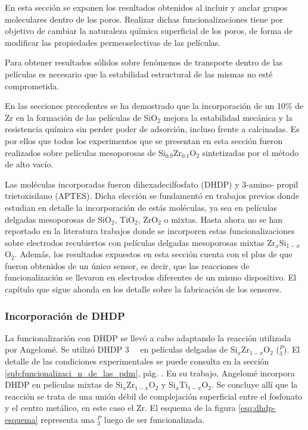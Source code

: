 			En esta sección se exponen los resultados obtenidos al incluir y anclar grupos moleculares dentro de los poros. Realizar dichas funcionalizaciones tiene por objetivo de cambiar la naturaleza química superficial de los poros, de forma de modificar las propiedades permeoselectivas de las películas. 

			Para obtener resultados sólidos sobre fenómenos de transporte dentro de las películas es necesario que la estabilidad estructural de las mismas no esté comprometida. 

			En las secciones precedentes se ha demostrado que la incorporación de un 10\% de Zr en la formación de las películas de SiO$_2$ mejora la estabilidad mecánica y la resistencia química sin perder poder de adsorción, incluso frente a \pdmF\space calcinadas. Es por ellos que todos los experimentos que se presentan en esta sección fueron realizados sobre películas mesoporosas de  Si$_{0.9}$Zr$_{0.1}$O$_2$ sintetizadas por el método de alto vacío.

			Las moléculas incorporadas fueron dihexadecilfosfato (DHDP) y 3-amino-\- propil trietoxisilano (APTES). Dicha elección se fundamentó en trabajos previos donde estudian en detalle la incorporación de estás moléculas, ya sea en películas delgadas mesoporosas de SiO$_2$, TiO$_2$, ZrO$_2$ o mixtas.\cite{Calvo2009b,Angelome2008,Fattakhova-Rohlfing2007,Andrieu-brunsen2014,Andrieu-Brunsen2015} Hasta ahora no se han reportado en la literatura trabajos donde se incorporen estas funcionalizaciones sobre electrodos recubiertos con películas delgadas mesoporosas mixtas Zr$_x$Si$_{1-x}$O$_2$. Además, los resultados expuestos en esta sección cuenta con el plus de que fueron obtenidos de un único sensor, es decir, que las reacciones de funcionalización se llevaron en electrodos diferentes de un mismo dispositivo. El capítulo que sigue ahonda en los detalle sobre la fabricación de los sensores.
	
		\subsubsection{Incorporación de DHDP}
	
			La funcionalización con DHDP se llevó a cabo adaptando la reacción utilizada por Angelomé\cite{Angelome2008}. Se utilizó DHDP \SI{3}{\milli\Molar} en películas delgadas de Si$_x$Zr$_{1-x}$O$_2$ (\pdmZ$^P_3$). El detalle de las condiciones experimentales se puede consulta en la sección \ref{sub:funcionalizaci_n_de_las_pdm}, pág. \pageref{sub:funcionalizaci_n_de_las_pdm}. En su trabajo, Angelomé incorpora DHDP en películas mixtas de Si$_x$Zr$_{1-x}$O$_2$ y Si$_x$Ti$_{1-x}$O$_2$. Se concluye allí que la reacción se trata de una unión débil de complejación superficial entre el fosfonato y el centro metálico, en este caso el Zr. El esquema de la figura \ref{esq:dhdp-esquema} representa una \pdmZ$^P_3$ luego de ser funcionalizada.

